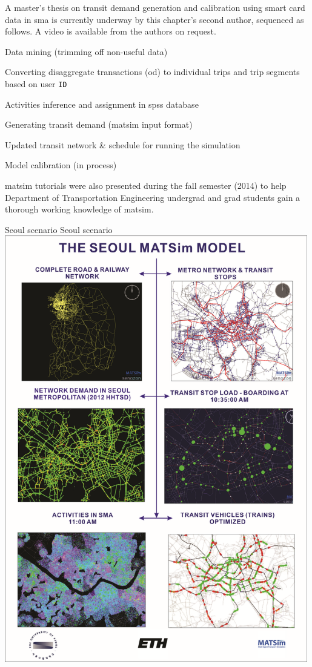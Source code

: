 A master's thesis on transit demand generation and calibration using smart card data in \gls{sma} is currently underway by this chapter's second author, sequenced as follows. A video is available from the authors on request.
%
\begin{compactitem}
\item Data mining (trimming off non-useful data)
\item	Converting disaggregate transactions (\gls{od}) to individual trips and trip segments based on user \lstinline|ID|
\item	Activities inference and assignment in \gls{spss} database
\item	Generating transit demand (\gls{matsim} input format)
\item	Updated transit network \& schedule for running the simulation
\item	Model calibration (in process)
\end{compactitem}
%
\gls{matsim} tutorials were also presented during the fall semester (2014) to help Department of Transportation Engineering undergrad and grad students gain a thorough working knowledge of \gls{matsim}.

\createfigure%
{Seoul scenario}%
{Seoul scenario}%
{\label{fig:seoul}}%
{\includegraphics[width=0.99\textwidth, angle=0]{scenarios/figures/seoul}}%
{}

 
 
